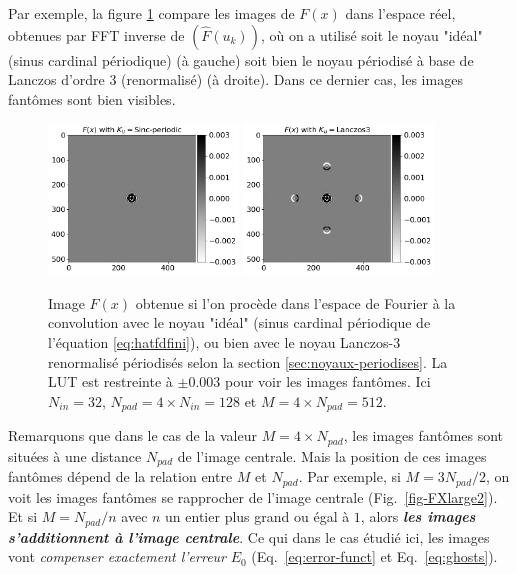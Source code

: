 \documentclass[11pt,twoside]{article}
\newcommand*\textitbf[1]{\textit{\textbf{#1}}}
\begin{document}
Par exemple, la figure \ref{fig-FXlarge} compare les images de $F(x)$ dans l'espace réel, obtenues par FFT inverse de $(\hat{F}(u_k))$, où on a utilisé soit le noyau "idéal" (sinus cardinal périodique) (à gauche) soit bien le noyau périodisé à base de Lanczos d'ordre 3 (renormalisé) (à droite). Dans ce dernier cas, les images fantômes sont bien visibles. 
\begin{figure}
\centering
\includegraphics[width=0.45\textwidth]{fig20a.png}
\includegraphics[width=0.45\textwidth]{fig20b.png}
\caption{Image $F(x)$ obtenue si l'on procède dans l'espace de Fourier à la convolution avec le noyau "idéal" (sinus cardinal périodique de l'équation \ref{eq:hatfdfini}), ou bien avec le noyau Lanczos-3 renormalisé  périodisés selon  la section \ref{sec:noyaux-periodises}. La LUT est restreinte à $\pm 0.003$ pour voir les images fantômes. Ici $N_{in}=32$, $N_{pad}=4\times N_{in}=128$ et $M=4\times N_{pad}=512$.}
\label{fig-FXlarge}
\end{figure}
Remarquons que dans le cas de la valeur $M=4\times N_{pad}$, les images fantômes sont situées  à une distance $N_{pad}$ de l'image centrale. Mais la position de ces images fantômes dépend de la relation entre $M$ et $N_{pad}$. Par exemple, si $M=3N_{pad}/2$, on voit les images fantômes se rapprocher de l'image centrale (Fig.~\ref{fig-FXlarge2}). Et si $M=N_{pad}/n$ avec $n$ un entier plus grand ou égal à $1$, alors \textitbf{les images s'additionnent à l'image centrale}. Ce qui dans le cas étudié ici, les images vont \textit{compenser exactement l'erreur} $E_0$ (Eq.~\ref{eq:error-funct} et Eq.~\ref{eq:ghosts}).
\end{document}
